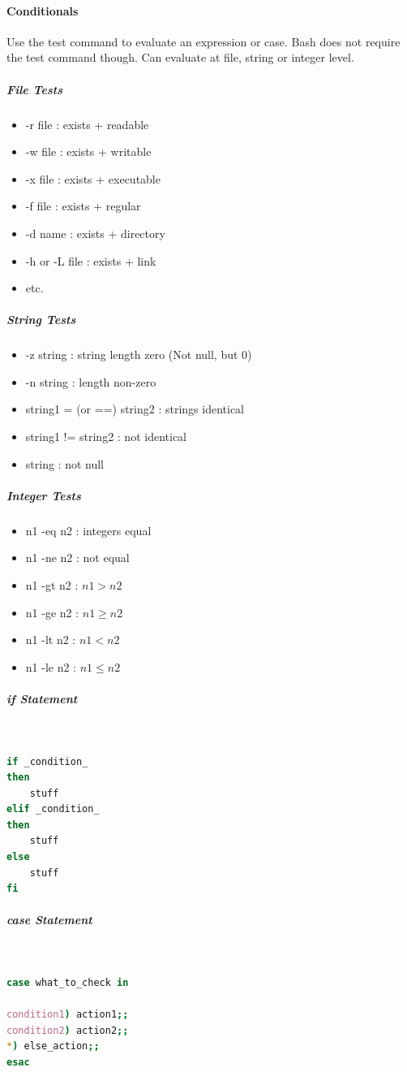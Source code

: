 \documentclass[12 pt]{article}
\begin{document}
	\paragraph{Conditionals} Use the test command to evaluate an expression or case. Bash does not require the test command though. Can evaluate at file, string or integer level.
	\subparagraph{File Tests}
	\begin{itemize}
		\item -r file : exists + readable
		\item -w file : exists + writable
		\item -x file : exists + executable
		\item -f file : exists + regular
		\item -d name : exists + directory
		\item -h or -L file : exists + link
		\item etc.
		\end{itemize}
	\subparagraph{String Tests}
	\begin{itemize}
		\item -z string : string length zero (Not null, but 0)
		\item -n string : length non-zero
		\item string1 = (or ==) string2 : strings identical
		\item string1 != string2 : not identical
		\item string : not null
		\end{itemize}
	\subparagraph{Integer Tests}
	\begin{itemize}
		\item n1 -eq n2 : integers equal
		\item n1 -ne n2 : not equal
		\item n1 -gt n2 : $n1>n2$
		\item n1 -ge n2 : $n1 \geq n2$
		\item n1 -lt n2 : $n1<n2$
		\item n1 -le n2 : $n1 \leq n2$
		\end{itemize}
	\subparagraph{if Statement} ~
\begin{lstlisting}[language=bash]
if _condition_
then
	stuff
elif _condition_
then
	stuff
else
	stuff
fi
\end{lstlisting}
\subparagraph{case Statement}~
\begin{lstlisting}[language=bash]
case what_to_check in

condition1) action1;;
condition2) action2;;
*) else_action;;
esac
\end{lstlisting}
\end{document}
